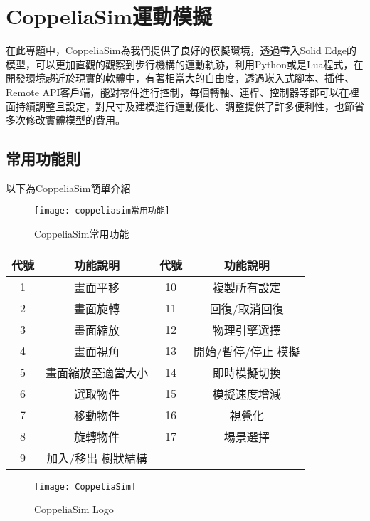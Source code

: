 \section{CoppeliaSim運動模擬}
在此專題中，CoppeliaSim為我們提供了良好的模擬環境，透過帶入Solid Edge的模型，可以更加直觀的觀察到步行機構的運動軌跡，利用Python或是Lua程式，在開發環境趨近於現實的軟體中，有著相當大的自由度，透過崁入式腳本、插件、Remote API客戶端，能對零件進行控制，每個轉軸、連桿、控制器等都可以在裡面持續調整且設定，對尺寸及建模進行運動優化、調整提供了許多便利性，也節省多次修改實體模型的費用。\\

\subsection{常用功能則}
以下為CoppeliaSim簡單介紹

\begin{figure}[hbt!]
\center
\texttt{[image: coppeliasim常用功能]}
\caption{\Large CoppeliaSim常用功能}
\label{coppeliasim常用功能}
\end{figure}

\begin{table}[htbp]
  \centering
  \large
  \setlength{\tabcolsep}{0.7cm}
  \begin{tabular}{|c|c|c|c|}
    \hline
    代號 & 功能說明 & 代號 & 功能說明 \\
    \hline
    1 & 畫面平移 & 10 & 複製所有設定 \\
    \hline
    2 & 畫面旋轉 & 11 & 回復/取消回復 \\
    \hline
    3 & 畫面縮放 & 12 & 物理引擎選擇 \\
    \hline
    4 & 畫面視角 & 13 & 開始/暫停/停止 模擬 \\
    \hline
    5 & 畫面縮放至適當大小 & 14 & 即時模擬切換 \\
    \hline
    6 & 選取物件 & 15 & 模擬速度增減 \\
    \hline
    7 & 移動物件 & 16 & 視覺化 \\
    \hline
    8 & 旋轉物件 & 17 & 場景選擇 \\
    \hline
    9 & 加入/移出 樹狀結構 & & \\
    \hline
  \end{tabular}
\end{table}

\begin{figure}[hbt!]
\center
\texttt{[image: CoppeliaSim]}
\caption{\Large CoppeliaSim Logo}
\end{figure}

